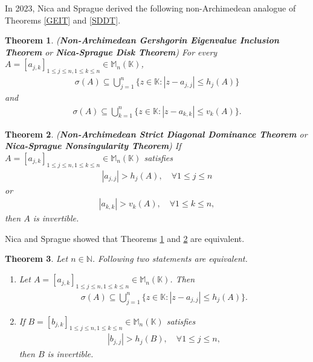 \documentclass{amsart}
\newtheorem{theorem}{Theorem}[section]
\begin{document}
In 2023, Nica and Sprague derived the  following non-Archimedean analogue of Theorems \ref{GEIT} and \ref{SDDT}. 
\begin{theorem} \label{NS}  \cite{NICASPRAGUE} (\textbf{Non-Archimedean Gershgorin Eigenvalue Inclusion Theorem} or \textbf{Nica-Sprague Disk Theorem}) 	For every $A=[a_{j,k}]_{1\leq j\leq n, 1\leq k \leq n}\in  \mathbb{M}_n(\mathbb{K})$,
	\begin{align*}
		\sigma(A)\subseteq \bigcup_{j=1}^n\{z \in \mathbb{K}: |z-a_{j, j}|\leq h_j(A)\}
	\end{align*}
	and 
	\begin{align*}
		\sigma(A)\subseteq \bigcup_{k=1}^n\{z \in \mathbb{K}: |z-a_{k, k}|\leq v_k(A)\}. 
	\end{align*}
\end{theorem}
\begin{theorem} \label{NS2} \cite{NICASPRAGUE} (\textbf{Non-Archimedean Strict Diagonal Dominance Theorem} or \textbf{Nica-Sprague Nonsingularity Theorem}) 
	If  $A=[a_{j,k}]_{1\leq j\leq n, 1\leq k \leq n}\in  \mathbb{M}_n(\mathbb{K})$ satisfies
	\begin{align*}
		|a_{j,j}|>h_j(A), \quad \forall 1\leq j \leq n
	\end{align*}
	or 
	\begin{align*}
		|a_{k,k}|>v_k(A), \quad \forall 1\leq k \leq n,
	\end{align*}
	then $A$ is invertible. 	
\end{theorem}
Nica and Sprague showed that  Theorems \ref{NS} and \ref{NS2} are equivalent. 
\begin{theorem} \cite{NICASPRAGUE}
	Let $n \in \mathbb{N}$.  Following two statements are equivalent. 
	\begin{enumerate}[\upshape(i)]
		\item Let $A=[a_{j,k}]_{1\leq j\leq n, 1\leq k \leq n}\in  \mathbb{M}_n(\mathbb{K})$. Then 
		\begin{align*}
			\sigma(A)\subseteq \bigcup_{j=1}^n\{z \in \mathbb{K}: |z-a_{j, j}|\leq h_j(A)\}.
		\end{align*}
		\item 	If  $B=[b_{j,k}]_{1\leq j\leq n, 1\leq k \leq n}\in  \mathbb{M}_n(\mathbb{K})$ satisfies
		\begin{align*}
			|b_{j,j}|>h_j(B), \quad \forall 1\leq j \leq n,
		\end{align*}
		then $B$ is invertible. 
	\end{enumerate}	
\end{theorem}
\end{document}
